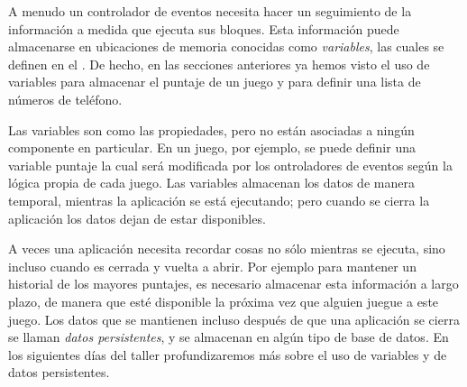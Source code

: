 A menudo un controlador de eventos necesita hacer un seguimiento de la información a medida que ejecuta sus bloques. Esta información puede almacenarse en ubicaciones de memoria conocidas como \emph{variables}, las cuales se definen en el \blockEditor. De hecho, en las secciones anteriores ya hemos visto el uso de variables para almacenar el puntaje de un juego y para definir una lista de números de teléfono.

Las variables son como las propiedades, pero no están asociadas a ningún componente en particular. En un juego, por ejemplo, se puede definir una variable puntaje la cual será modificada por los ontroladores de eventos según la lógica propia de cada juego. Las variables almacenan los datos de manera temporal, mientras la aplicación se está ejecutando; pero cuando se cierra la aplicación los datos dejan de estar disponibles.

A veces una aplicación necesita recordar cosas no sólo mientras se ejecuta, sino incluso cuando es cerrada y vuelta a abrir. Por ejemplo para mantener un historial de los mayores puntajes, es necesario almacenar esta información a largo plazo, de manera que esté disponible la próxima vez que alguien juegue a este juego. Los datos que se mantienen incluso después de que una aplicación se cierra se llaman \emph{datos persistentes}, y se almacenan en algún tipo de base de datos. En los siguientes días del taller profundizaremos más sobre el uso de variables y de datos persistentes.


